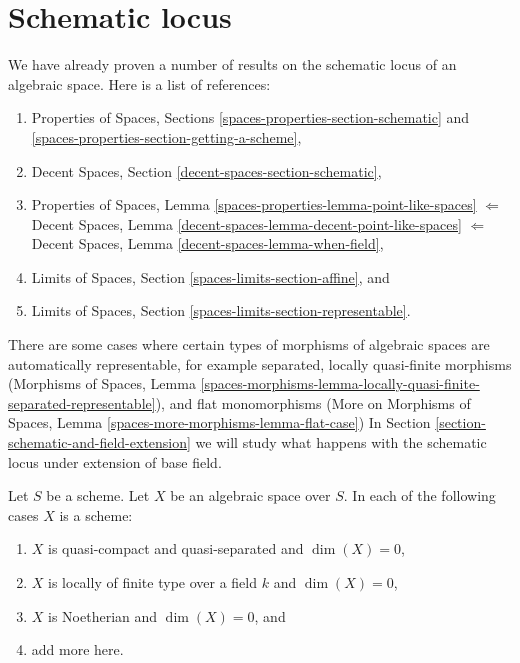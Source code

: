 \section{Schematic locus}
\label{section-schematic}

\noindent
We have already proven a number of results on the schematic locus
of an algebraic space. Here is a list of references:
\begin{enumerate}
\item Properties of Spaces, Sections
\ref{spaces-properties-section-schematic} and
\ref{spaces-properties-section-getting-a-scheme},
\item Decent Spaces, Section \ref{decent-spaces-section-schematic},
\item Properties of Spaces, Lemma
\ref{spaces-properties-lemma-point-like-spaces}
$\Leftarrow$
Decent Spaces, Lemma \ref{decent-spaces-lemma-decent-point-like-spaces}
$\Leftarrow$
Decent Spaces, Lemma \ref{decent-spaces-lemma-when-field},
\item Limits of Spaces, Section \ref{spaces-limits-section-affine}, and
\item Limits of Spaces, Section \ref{spaces-limits-section-representable}.
\end{enumerate}
There are some cases where certain types of morphisms of algebraic spaces
are automatically representable, for example
separated, locally quasi-finite morphisms (Morphisms of Spaces, Lemma
\ref{spaces-morphisms-lemma-locally-quasi-finite-separated-representable}),
and flat monomorphisms (More on Morphisms of Spaces, Lemma
\ref{spaces-more-morphisms-lemma-flat-case})
In Section \ref{section-schematic-and-field-extension}
we will study what happens with the schematic
locus under extension of base field.

\begin{lemma}
\label{lemma-locally-finite-type-dim-zero}
Let $S$ be a scheme. Let $X$ be an algebraic space over $S$.
In each of the following cases $X$ is a scheme:
\begin{enumerate}
\item $X$ is quasi-compact and quasi-separated and $\dim(X) = 0$,
\item $X$ is locally of finite type over a field $k$ and $\dim(X) = 0$,
\item $X$ is Noetherian and $\dim(X) = 0$, and
\item add more here.
\end{enumerate}
\end{lemma}

